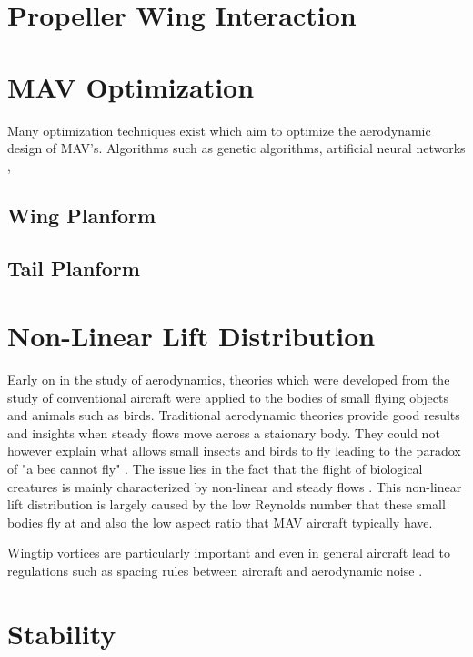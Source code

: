 \section{Propeller Wing Interaction}
\label{sec:Propeller Wing Interaction}

\section{MAV Optimization}
\label{sec:MAV Optimization}
Many optimization techniques exist which aim to optimize the aerodynamic design of MAV's. Algorithms such as genetic algorithms, artificial neural networks \cite{Boutemedjet2019}, 
\subsection{Wing Planform}

\subsection{Tail Planform}

\section{Non-Linear Lift Distribution}
\label{sec:Non-Linear Lift Distribution}
Early on in the study of aerodynamics, theories which were developed from the study of conventional aircraft were applied to the bodies of small flying objects and animals such as birds. Traditional aerodynamic theories provide good results and insights when steady flows move across a staionary body. They could not however explain what allows small insects and birds to fly leading to the paradox of "a bee cannot fly" \cite{bees} \cite{Roccia2016}. The issue lies in the fact that the flight of biological creatures is mainly characterized by non-linear and steady flows \cite{Roccia2016}. This non-linear lift distribution is largely caused by the low Reynolds number that these small bodies fly at and also the low aspect ratio that MAV aircraft typically have.

Wingtip vortices are particularly important and even in general aircraft lead to regulations such as spacing rules between aircraft and aerodynamic noise \cite{Qin2021}. 










\section{Stability}



